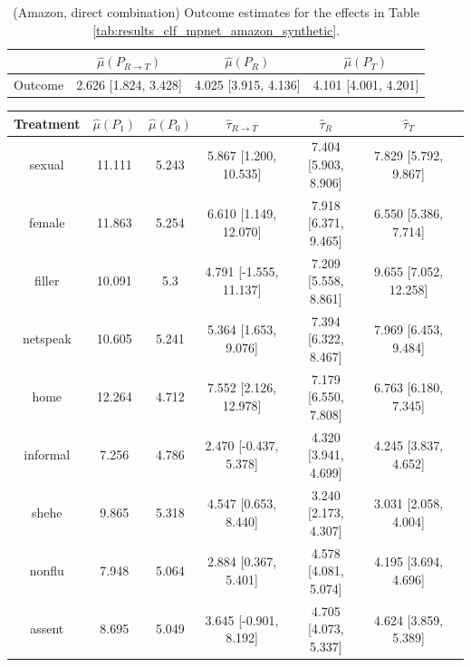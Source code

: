\documentclass{article}
\begin{document}
\begin{table}[!ht]
    \centering
    \begin{tabular}{c|ccc}
    \toprule
     & $\hat{\mu}(P_{R \rightarrow T})$   & $\hat{\mu}(P_R)$     & $\hat{\mu}(P_T)$     \\
\midrule
 Outcome & 2.626 [1.824, 3.428]               & 4.025 [3.915, 4.136] & 4.101 [4.001, 4.201] \\
\bottomrule
    \end{tabular}
    \caption{(Amazon, direct combination) Outcome estimates for the effects in Table \ref{tab:results_clf_mpnet_amazon_synthetic}.}
    \label{tab:results_clf_mpnet_amazon_synthetic_outcome}
\end{table}

\begin{table}[!ht]
    \centering
    \begin{tabular}{c|cccccc}
\toprule
    Treatment   &   $\hat{\mu}(P_1)$ &   $\hat{\mu}(P_0)$ & $\hat{\tau}_{R \rightarrow T}$   & $\hat{\tau}_R$       & $\hat{\tau}_T$        \\
\midrule
    sexual      &             11.111 &              5.243 & 5.867 [1.200, 10.535]            & 7.404 [5.903, 8.906] & 7.829 [5.792, 9.867]  \\
    female      &             11.863 &              5.254 & 6.610 [1.149, 12.070]            & 7.918 [6.371, 9.465] & 6.550 [5.386, 7.714]  \\
    filler      &             10.091 &              5.3   & 4.791 [-1.555, 11.137]           & 7.209 [5.558, 8.861] & 9.655 [7.052, 12.258] \\
    netspeak    &             10.605 &              5.241 & 5.364 [1.653, 9.076]             & 7.394 [6.322, 8.467] & 7.969 [6.453, 9.484]  \\
    home        &             12.264 &              4.712 & 7.552 [2.126, 12.978]            & 7.179 [6.550, 7.808] & 6.763 [6.180, 7.345]  \\
    informal    &              7.256 &              4.786 & 2.470 [-0.437, 5.378]            & 4.320 [3.941, 4.699] & 4.245 [3.837, 4.652]  \\
    shehe       &              9.865 &              5.318 & 4.547 [0.653, 8.440]             & 3.240 [2.173, 4.307] & 3.031 [2.058, 4.004]  \\
    nonflu      &              7.948 &              5.064 & 2.884 [0.367, 5.401]             & 4.578 [4.081, 5.074] & 4.195 [3.694, 4.696]  \\
    assent      &              8.695 &              5.049 & 3.645 [-0.901, 8.192]            & 4.705 [4.073, 5.337] & 4.624 [3.859, 5.389]  \\

\end{tabular}
\end{table}
\end{document}
